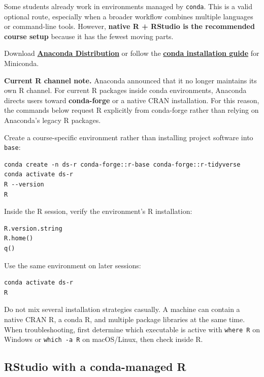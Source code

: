 Some students already work in environments managed by \texttt{conda}. This is a valid optional route, especially when a broader workflow combines multiple languages or command-line tools. However, \textbf{native R + RStudio is the recommended course setup} because it has the fewest moving parts.

Download \href{https://www.anaconda.com/download}{\textbf{Anaconda Distribution}} or follow the \href{https://docs.conda.io/projects/conda/en/stable/user-guide/install/}{\textbf{conda installation guide}} for Miniconda.

\begin{referencebox}
\textbf{Current R channel note.} Anaconda announced that it no longer maintains its own R channel. For current R packages inside conda environments, Anaconda directs users toward \textbf{conda-forge} or a native CRAN installation. For this reason, the commands below request R explicitly from conda-forge rather than relying on Anaconda's legacy R packages.
\end{referencebox}

Create a course-specific environment rather than installing project software into \texttt{base}:

\begin{lstlisting}[style=mlterminal]
conda create -n ds-r conda-forge::r-base conda-forge::r-tidyverse
conda activate ds-r
R --version
R
\end{lstlisting}

Inside the R session, verify the environment's R installation:

\begin{lstlisting}[style=dsr]
R.version.string
R.home()
q()
\end{lstlisting}

Use the same environment on later sessions:

\begin{lstlisting}[style=mlterminal]
conda activate ds-r
R
\end{lstlisting}

\begin{pitfall}
Do not mix several installation strategies casually. A machine can contain a native CRAN R, a conda R, and multiple package libraries at the same time. When troubleshooting, first determine which executable is active with \texttt{where R} on Windows or \texttt{which -a R} on macOS/Linux, then check  inside R.
\end{pitfall}

\subsection{RStudio with a conda-managed R}

